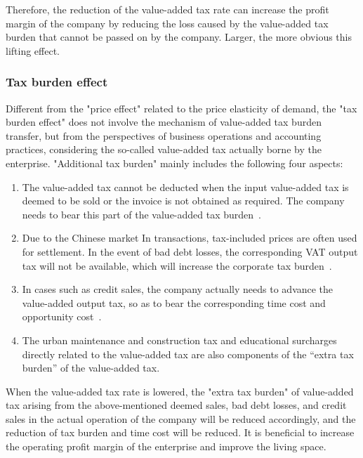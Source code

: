 \documentclass[3p,times]{elsarticle}
\begin{document}
Therefore, the reduction of the value-added tax rate can increase the profit margin of the company by reducing the loss caused by the value-added tax burden that cannot be passed on by the company. Larger, the more obvious this lifting effect.

\subsubsection{Tax burden effect}
Different from the "price effect" related to the price elasticity of demand, the "tax burden effect" does not involve the mechanism of value-added tax burden transfer, but from the perspectives of business operations and accounting practices, considering the so-called value-added tax actually borne by the enterprise. "Additional tax burden" mainly includes the following four aspects:
\begin{enumerate}[(1)]
    \item The value-added tax cannot be deducted when the input value-added tax is deemed to be sold or the invoice is not obtained as required. The company needs to bear this part of the value-added tax burden{\color{red}~\cite{liu2018theimpact}}.
    \item Due to the Chinese market In transactions, tax-included prices are often used for settlement. In the event of bad debt losses, the corresponding VAT output tax will not be available, which will increase the corporate tax burden{\color{red}~\cite{yue2020empirical}}.
    \item In cases such as credit sales, the company actually needs to advance the value-added output tax, so as to bear the corresponding time cost and opportunity cost{\color{red}~\cite{lv2008Improvement}}.
    \item The urban maintenance and construction tax and educational surcharges directly related to the value-added tax are also components of the “extra tax burden” of the value-added tax.
\end{enumerate}
When the value-added tax rate is lowered, the "extra tax burden" of value-added tax arising from the above-mentioned deemed sales, bad debt losses, and credit sales in the actual operation of the company will be reduced accordingly, and the reduction of tax burden and time cost will be reduced. It is beneficial to increase the operating profit margin of the enterprise and improve the living space.
\end{document}
